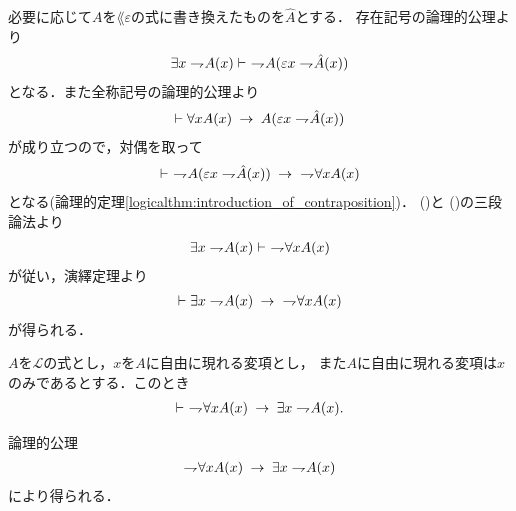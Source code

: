 	\begin{sketch}
		必要に応じて$A$を$\lang{\varepsilon}$の式に書き換えたものを$\hat{A}$とする．
		存在記号の論理的公理より
		\begin{align}
			\exists x \rightharpoondown\hspace{-0.25em} A(x) \vdash\ \rightharpoondown\hspace{-0.25em} A(\varepsilon x \rightharpoondown\hspace{-0.25em} \hat{A}(x))
			\label{fom:weak_De_Morgan_law_for_quantifiers_1_1}
		\end{align}
		となる．また全称記号の論理的公理より
		\begin{align}
			\vdash \forall x A(x) \hspace{0.25em}\rightarrow\hspace{0.25em} A(\varepsilon x \rightharpoondown\hspace{-0.25em} \hat{A}(x))
		\end{align}
		が成り立つので，対偶を取って
		\begin{align}
			\vdash\ \rightharpoondown\hspace{-0.25em} A(\varepsilon x \rightharpoondown\hspace{-0.25em} \hat{A}(x)) \hspace{0.25em}\rightarrow\hspace{0.25em}\ \rightharpoondown\hspace{-0.25em} \forall x A(x)
			\label{fom:weak_De_Morgan_law_for_quantifiers_1_2}
		\end{align}
		となる(論理的定理\ref{logicalthm:introduction_of_contraposition})．
		()と
		()の三段論法より
		\begin{align}
			\exists x \rightharpoondown\hspace{-0.25em} A(x) \vdash\ \rightharpoondown\hspace{-0.25em} \forall x A(x)
		\end{align}
		が従い，演繹定理より
		\begin{align}
			\vdash \exists x \rightharpoondown\hspace{-0.25em} A(x) \hspace{0.25em}\rightarrow\hspace{0.25em}\ \rightharpoondown\hspace{-0.25em} \forall x A(x)
		\end{align}
		が得られる．
		\QED
	\end{sketch}
	
	\begin{screen}
		\begin{logicalthm}
		\label{logicalthm:weak_De_Morgan_law_for_quantifiers_2}
			$A$を$\mathcal{L}$の式とし，$x$を$A$に自由に現れる変項とし，
			また$A$に自由に現れる変項は$x$のみであるとする．このとき
			\begin{align}
				\vdash\ \rightharpoondown\hspace{-0.25em} \forall x A(x) \hspace{0.25em}\rightarrow\hspace{0.25em} \exists x \rightharpoondown\hspace{-0.25em} A(x).
			\end{align}
		\end{logicalthm}
	\end{screen}
	
	\begin{sketch}
		論理的公理
		\begin{align}
			\rightharpoondown\hspace{-0.25em} \forall x A(x) \hspace{0.25em}\rightarrow\hspace{0.25em} \exists x \rightharpoondown\hspace{-0.25em} A(x)
		\end{align}
		により得られる．
		\QED
	\end{sketch}
	
